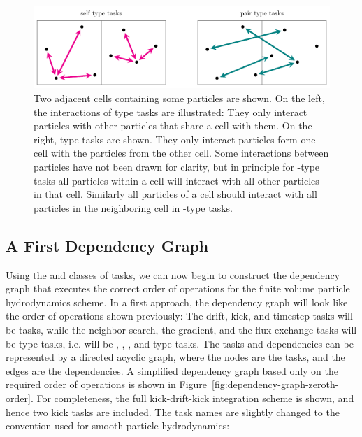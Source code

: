 \begin{figure}
 \centering
 \includegraphics[width=\linewidth]{figures/Meshless/self-pair.pdf}%
 \caption{
 Two adjacent cells containing some particles are shown. On the left, the interactions of
 type tasks are illustrated: They only interact particles with other particles that
share a cell with them. On the right,  type tasks are shown. They only interact
particles form one cell with the particles from the other cell. Some interactions between particles
have not been drawn for clarity, but in principle for -type tasks all particles within
a cell will interact with all other particles in that cell. Similarly all particles of a cell
should interact with all particles in the neighboring cell in -type tasks. }
 \label{fig:self-pair-tasks}
\end{figure}




\subsection{A First Dependency Graph}

Using the  and  classes of tasks, we can now begin to construct the
dependency graph that executes the correct order of operations for the finite volume particle
hydrodynamics scheme. In a first approach, the dependency graph will look like the order of
operations shown previously: The drift, kick, and timestep tasks will be  tasks, while
the neighbor search, the gradient, and the flux exchange tasks will be  type
tasks, i.e. will be , , , and  type tasks.
The tasks and dependencies can be represented by a directed acyclic graph, where the nodes are the
tasks, and the edges are the dependencies. A simplified dependency graph based only on the required
order of operations is shown in Figure~\ref{fig:dependency-graph-zeroth-order}. For completeness,
the full kick-drift-kick integration scheme is shown, and hence two kick tasks are included. The
task names are slightly changed to the convention used for smooth particle hydrodynamics:

